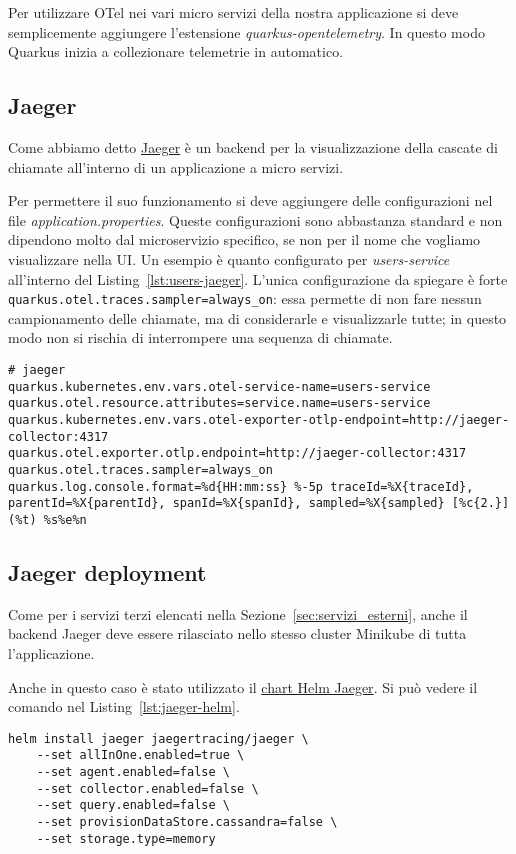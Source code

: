 \myskip

Per utilizzare OTel nei vari micro servizi della nostra applicazione si deve semplicemente aggiungere l'estensione \textit{quarkus-opentelemetry}. In questo modo Quarkus inizia a collezionare telemetrie in automatico.

\subsection{Jaeger}
Come abbiamo detto \href{https://www.jaegertracing.io}{Jaeger} è un backend per la visualizzazione della cascate di chiamate all'interno di un applicazione a micro servizi.

Per permettere il suo funzionamento si deve aggiungere delle configurazioni nel file \textit{application.properties}. Queste configurazioni sono abbastanza standard e non dipendono molto dal microservizio specifico, se non per il nome che vogliamo visualizzare nella UI. Un esempio è quanto configurato per \textit{users-service} all'interno del Listing~\ref{lst:users-jaeger}. L'unica configurazione da spiegare è forte \texttt{quarkus.otel.traces.sampler=always\_on}: essa permette di non fare nessun campionamento delle chiamate, ma di considerarle e visualizzarle tutte; in questo modo non si rischia di interrompere una sequenza di chiamate.
\begin{lstlisting}[caption=Jaeger configuration for \textit{users-service}, label=lst:users-jaeger]
# jaeger
quarkus.kubernetes.env.vars.otel-service-name=users-service
quarkus.otel.resource.attributes=service.name=users-service
quarkus.kubernetes.env.vars.otel-exporter-otlp-endpoint=http://jaeger-collector:4317
quarkus.otel.exporter.otlp.endpoint=http://jaeger-collector:4317
quarkus.otel.traces.sampler=always_on
quarkus.log.console.format=%d{HH:mm:ss} %-5p traceId=%X{traceId}, parentId=%X{parentId}, spanId=%X{spanId}, sampled=%X{sampled} [%c{2.}] (%t) %s%e%n
\end{lstlisting}

\subsection{Jaeger deployment}
Come per i servizi terzi elencati nella Sezione~\ref{sec:servizi_esterni}, anche il backend Jaeger deve essere rilasciato nello stesso cluster Minikube di tutta l'applicazione.

Anche in questo caso è stato utilizzato il \href{https://artifacthub.io/packages/helm/jaegertracing/jaeger}{chart Helm Jaeger}. Si può vedere il comando nel Listing~\ref{lst:jaeger-helm}.
\begin{lstlisting}[caption=Install Jaeger chart for \textit{users-service}, label=lst:jaeger-helm]
helm install jaeger jaegertracing/jaeger \
    --set allInOne.enabled=true \
    --set agent.enabled=false \
    --set collector.enabled=false \
    --set query.enabled=false \
    --set provisionDataStore.cassandra=false \
    --set storage.type=memory
\end{lstlisting}